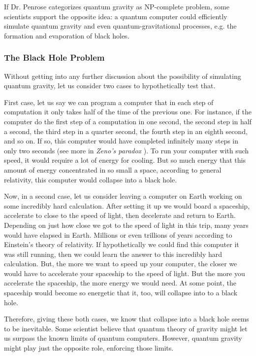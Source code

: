 \documentclass[twoside,11pt]{article}
\begin{document}
If Dr. Penrose categorizes quantum gravity as NP-complete problem, some scientists support the opposite idea: a quantum computer could efficiently simulate quantum gravity and even quantum-gravitational processes, e.g. the formation and evaporation of black holes.

\subsubsection{The Black Hole Problem}

Without getting into any further discussion about the possibility of simulating quantum gravity, let us consider two cases to hypothetically test that.

First case, let us say we can program a computer that in each step of computation it only takes half of the time of the previous one.
For instance, if the computer do the first step of a computation in one second, the second step in half a second, the third step in a quarter second, the fourth step in an eighth second, and so on.
If so, this computer would have completed infinitely many steps in only two seconds (see more in \emph{Zeno’s paradox} \citep{erickson1998dictionary}).
To run your computer with such speed, it would require a lot of energy for cooling.
But so much energy that this amount of energy concentrated in so small a space, according to general relativity, this computer would collapse into a black hole.

Now, in a second case, let us consider leaving a computer on Earth working on some incredibly hard calculation.
After setting it up we would board a spaceship, accelerate to close to the speed of light, then decelerate and return to Earth.
Depending on just how close we got to the speed of light in this trip, many years would have elapsed in Earth.
Millions or even trillions of years according to Einstein’s  theory of relativity.
If hypothetically we could find this computer it was still running, then we could learn the answer to this incredibly hard calculation.
But, the more we want to speed up your computer, the closer we would have to accelerate your spaceship to the speed of light. 
But the more you accelerate the spaceship, the more energy we would need.
At some point, the spaceship would become so energetic that it, too, will collapse into to a black hole.
 
Therefore, giving these both cases, we know that collapse into a black hole seems to be inevitable.
Some scientist believe that quantum theory of gravity might let us surpass the known limits of quantum computers.
However, quantum gravity might play just the opposite role, enforcing those limits.
 
\end{document}

